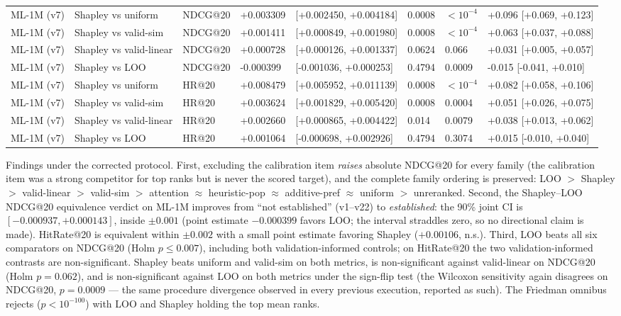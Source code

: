 \documentclass[pdflatex,sn-mathphys-num]{sn-jnl}
\begin{document}
\begin{table}[t]
{\begin{tabular}{llllllll}
ML-1M (v7) & Shapley vs uniform & NDCG@20 & +0.003309 & [+0.002450, +0.004184] & 0.0008 & $<10^{-4}$ & +0.096 [+0.069, +0.123] \\
ML-1M (v7) & Shapley vs valid-sim & NDCG@20 & +0.001411 & [+0.000849, +0.001980] & 0.0008 & $<10^{-4}$ & +0.063 [+0.037, +0.088] \\
ML-1M (v7) & Shapley vs valid-linear & NDCG@20 & +0.000728 & [+0.000126, +0.001337] & 0.0624 & 0.066 & +0.031 [+0.005, +0.057] \\
ML-1M (v7) & Shapley vs LOO & NDCG@20 & -0.000399 & [-0.001036, +0.000253] & 0.4794 & 0.0009 & -0.015 [-0.041, +0.010] \\
ML-1M (v7) & Shapley vs uniform & HR@20 & +0.008479 & [+0.005952, +0.011139] & 0.0008 & $<10^{-4}$ & +0.082 [+0.058, +0.106] \\
ML-1M (v7) & Shapley vs valid-sim & HR@20 & +0.003624 & [+0.001829, +0.005420] & 0.0008 & 0.0004 & +0.051 [+0.026, +0.075] \\
ML-1M (v7) & Shapley vs valid-linear & HR@20 & +0.002660 & [+0.000865, +0.004422] & 0.014 & 0.0079 & +0.038 [+0.013, +0.062] \\
ML-1M (v7) & Shapley vs LOO & HR@20 & +0.001064 & [-0.000698, +0.002926] & 0.4794 & 0.3074 & +0.015 [-0.010, +0.040] \\
\bottomrule
\end{tabular}
}
\end{table}

Findings under the corrected protocol. First, excluding the calibration item \emph{raises} absolute NDCG@20 for every family (the calibration item was a strong competitor for top ranks but is never the scored target), and the complete family ordering is preserved: LOO $>$ Shapley $>$ valid-linear $>$ valid-sim $>$ attention $\approx$ heuristic-pop $\approx$ additive-pref $\approx$ uniform $>$ unreranked. Second, the Shapley--LOO NDCG@20 equivalence verdict on ML-1M improves from ``not established'' (v1--v22) to \emph{established}: the 90\% joint CI is $[-0.000937,+0.000143]$, inside $\pm0.001$ (point estimate $-0.000399$ favors LOO; the interval straddles zero, so no directional claim is made). HitRate@20 is equivalent within $\pm0.002$ with a small point estimate favoring Shapley ($+0.00106$, n.s.). Third, LOO beats all six comparators on NDCG@20 (Holm $p\le0.007$), including both validation-informed controls; on HitRate@20 the two validation-informed contrasts are non-significant. Shapley beats uniform and valid-sim on both metrics, is non-significant against valid-linear on NDCG@20 (Holm $p=0.062$), and is non-significant against LOO on both metrics under the sign-flip test (the Wilcoxon sensitivity again disagrees on NDCG@20, $p=0.0009$ --- the same procedure divergence observed in every previous execution, reported as such). The Friedman omnibus rejects ($p<10^{-100}$) with LOO and Shapley holding the top mean ranks.
\end{document}
